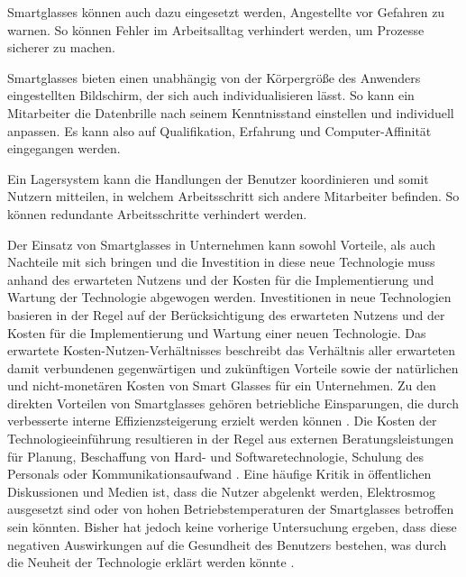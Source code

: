 Smartglasses können auch dazu eingesetzt werden, Angestellte vor Gefahren zu warnen. So können Fehler im Arbeitsalltag verhindert werden, um Prozesse sicherer zu machen. 
%

Smartglasses bieten einen unabhängig von der Körpergröße des Anwenders eingestellten Bildschirm, der sich auch individualisieren lässt. So kann ein Mitarbeiter die Datenbrille nach seinem Kenntnisstand einstellen und individuell anpassen. Es kann also auf Qualifikation, Erfahrung und Computer-Affinität eingegangen werden.

Ein Lagersystem kann die Handlungen der Benutzer koordinieren und somit Nutzern mitteilen, in welchem Arbeitsschritt sich andere Mitarbeiter befinden. So können redundante Arbeitsschritte verhindert werden. 
%

Der Einsatz von Smartglasses in Unternehmen kann sowohl Vorteile, als auch Nachteile mit sich bringen und die Investition in diese neue Technologie muss anhand des erwarteten Nutzens und der Kosten für die Implementierung und Wartung der Technologie abgewogen werden. Investitionen in neue Technologien basieren in der Regel auf der Berücksichtigung des erwarteten Nutzens und der Kosten für die Implementierung und Wartung einer neuen Technologie. Das erwartete Kosten-Nutzen-Verhältnisses beschreibt das Verhältnis aller erwarteten damit verbundenen gegenwärtigen und zukünftigen Vorteile sowie der natürlichen und nicht-monetären Kosten von Smart Glasses für ein Unternehmen. Zu den direkten Vorteilen von Smartglasses gehören betriebliche Einsparungen, die durch verbesserte interne Effizienzsteigerung erzielt werden können \cite{Hein2016}.
Die Kosten der Technologieeinführung resultieren in der Regel aus externen Beratungsleistungen für Planung, Beschaffung von Hard- und Softwaretechnologie, Schulung des Personals oder Kommunikationsaufwand \cite{Hein2016}. Eine häufige Kritik in öffentlichen Diskussionen und Medien ist, dass die Nutzer abgelenkt werden, Elektrosmog ausgesetzt sind oder von hohen Betriebstemperaturen der Smartglasses betroffen sein könnten. Bisher hat jedoch keine vorherige Untersuchung ergeben, dass diese negativen Auswirkungen auf die Gesundheit des Benutzers bestehen, was durch die Neuheit der Technologie erklärt werden könnte \cite{Hein2016}.
%
%
%
%
%
%
